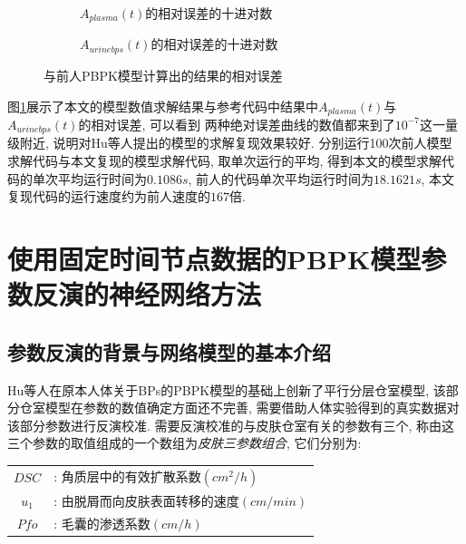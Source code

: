 \documentclass[a4paper,punct=banjiao,twoside]{ctexrep}
\theoremstyle{plain}
\theoremstyle{definition}
\theoremstyle{remark}
\begin{document}
\begin{figure}[H]
  \centering
  \begin{subfigure}{0.6\textwidth}
    \centering
    \resizebox{1\textwidth}{!}{}
    \caption{$A_{plasma}(t)$的相对误差的十进对数}
  \end{subfigure}
  \begin{subfigure}{0.6\textwidth}
    \centering
    \resizebox{1\textwidth}{!}{}
    \caption{$A_{urinebps}(t)$的相对误差的十进对数}
  \end{subfigure}
  \caption{与前人PBPK模型计算出的结果的相对误差}
  \label{PBPK模型结果对比}
\end{figure}


图\ref{PBPK模型结果对比}展示了本文的模型数值求解结果与参考代码\cite{12}中结果中$A_{plasma}(t)$与$A_{urinebps}(t)$的相对误差, 可以看到
两种绝对误差曲线的数值都来到了$10^{-7}$这一量级附近, 说明对Hu等人\cite{11}提出的模型的求解复现效果较好.
分别运行100次前人模型求解代码与本文复现的模型求解代码, 取单次运行的平均, 得到本文的模型求解代码的单次平均运行时间为$0.1086s$, 前人的代码单次平均运行时间为$18.1621s$,
本文复现代码的运行速度约为前人速度的$167$倍.


\chapter{使用固定时间节点数据的PBPK模型参数反演的神经网络方法}
\section{参数反演的背景与网络模型的基本介绍}

Hu等人\cite{11}在原本人体关于BPs的PBPK模型的基础上创新了平行分层仓室模型, 该部分仓室模型在参数的数值确定方面还不完善, 需要借助人体实验得到的真实数据对
该部分参数进行反演校准. 
需要反演校准的与皮肤仓室有关的参数有三个, 称由这三个参数的取值组成的一个数组为\textit{皮肤三参数组合}, 它们分别为:

\begin{table}[htbp]
  \centering
  \begin{tabular}[t]{|c*{1}{l}|}

    $DSC$ &: 角质层中的有效扩散系数$(cm^2/h)$ \\ 
  
    $u_1$  &: 由脱屑而向皮肤表面转移的速度$(cm/min)$ \\ 
  
    $Pfo$ &: 毛囊的渗透系数$(cm/h)$ \\ 

  \end{tabular}
\end{table}  
\end{document}

